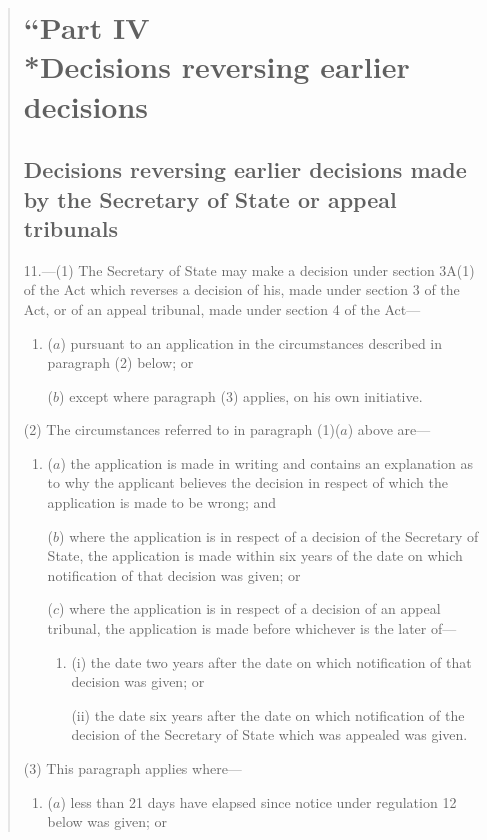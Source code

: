 \documentclass[12pt,a4paper]{article}
\begin{document}
\begin{quotation}
\section*{``Part IV\\*Decisions reversing earlier decisions}

\subsection*{Decisions reversing earlier decisions made by the Secretary of State or appeal tribunals}

11.---(1)  The Secretary of State may make a decision under section 3A(1) of the Act which reverses a decision of his, made under section 3 of the Act, or of an appeal tribunal, made under section 4 of the Act—
\begin{enumerate}\item[]
($a$) pursuant to an application in the circumstances described in paragraph (2) below; or

($b$) except where paragraph (3) applies, on his own initiative.
\end{enumerate}

(2) The circumstances referred to in paragraph (1)($a$) above are—
\begin{enumerate}\item[]
($a$) the application is made in writing and contains an explanation as to why the applicant believes the decision in respect of which the application is made to be wrong; and

($b$) where the application is in respect of a decision of the Secretary of State, the application is made within six years of the date on which notification of that decision was given; or

($c$) where the application is in respect of a decision of an appeal tribunal, the application is made before whichever is the later of—
\begin{enumerate}\item[]
(i) the date two years after the date on which notification of that decision was given; or

(ii) the date six years after the date on which notification of the decision of the Secretary of State which was appealed was given.
\end{enumerate}
\end{enumerate}

(3) This paragraph applies where—
\begin{enumerate}\item[]
($a$) less than 21 days have elapsed since notice under regulation 12 below was given; or


\end{enumerate}
\end{quotation}
\end{document}
